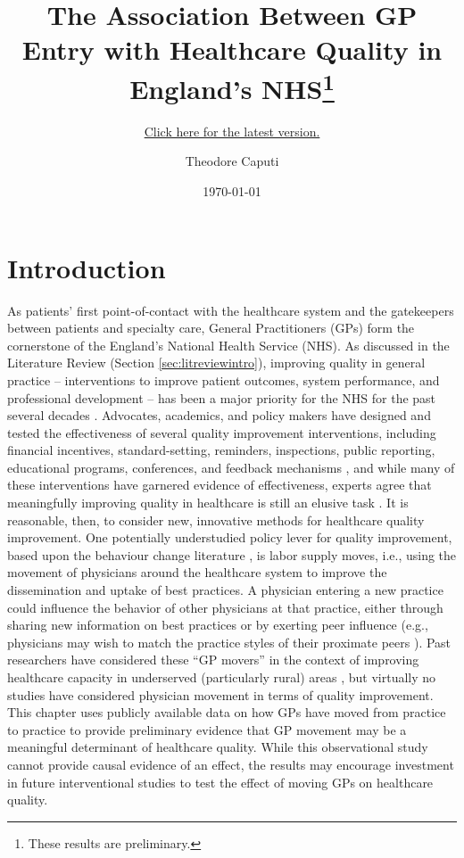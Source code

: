\documentclass[11pt]{article}
\subtitle{\href{https://www.TheodoreCaputi.com/files/movers.pdf}{Click here for the latest version.}}
\title{The Association Between GP Entry with Healthcare Quality in England's NHS\footnote{These results are preliminary.}}
\author{Theodore Caputi}
\date{\today}
\begin{document}
\maketitle

\tableofcontents
\newpage
\listoffigures
\newpage
\listoftables
\newpage

\section{Introduction}

As patients' first point-of-contact with the healthcare system and the gatekeepers between patients and specialty care, General Practitioners (GPs) form the cornerstone of the England's National Health Service (NHS). As discussed in the Literature Review (Section \ref{sec:litreviewintro}), improving quality in general practice -- interventions to improve patient outcomes, system performance, and professional development -- has been a major priority for the NHS for the past several decades \citep{bataldenWhatQualityImprovement2007}. Advocates, academics, and policy makers have designed and tested the effectiveness of several quality improvement interventions, including financial incentives, standard-setting, reminders, inspections, public reporting, educational programs, conferences, and feedback mechanisms \citep{oxmanNoMagicBullets1995}, and while many of these interventions have garnered evidence of effectiveness, experts agree that meaningfully improving quality in healthcare is still an elusive task \citep{braithwaiteChangingHowWe2018}. It is reasonable, then, to consider new, innovative methods for healthcare quality improvement. One potentially understudied policy lever for quality improvement, based upon the behaviour change literature \citep{rubensteinUnderstandingHealthCare2000,mittmanImplementingClinicalPractice1992}, is labor supply moves, i.e., using the movement of physicians around the healthcare system to improve the dissemination and uptake of best practices. A physician entering a new practice could influence the behavior of other physicians at that practice, either through sharing new information on best practices or by exerting peer influence (e.g., physicians may wish to match the practice styles of their proximate peers \citep{jongVariationHospitalLength2006}). Past researchers have considered these ``GP movers'' in the context of improving healthcare capacity in underserved (particularly rural) areas \citep{doleaEvaluatedStrategiesIncrease2010,liRetainingRuralDoctors2014,yongRuralIncentivesPayments2018}, but virtually no studies have considered physician movement in terms of quality improvement. This chapter uses publicly available data on how GPs have moved from practice to practice to provide preliminary evidence that GP movement may be a meaningful determinant of healthcare quality. While this observational study cannot provide causal evidence of an effect, the results may encourage investment in future interventional studies to test the effect of moving GPs on healthcare quality.
\end{document}
